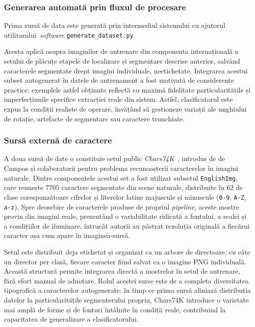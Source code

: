 \subsubsection{Generarea automată prin fluxul de procesare}
\indent\par
Prima sursă de data este generată prin intermediul sistemului cu ajutorul utilitarului~\textit{software} \texttt{generate\_dataset.py}

Acesta aplică asupra imaginilor de antrenare din componenta internațională a setului de plăcuțe etapele de localizare și segmentare descrise anterior, salvând caracterele segmentate drept imagini individuale, neetichetate. Integrarea acestui subset autogenerat în datele de antrenament a fost motivată de considerente practice: exemplele astfel obținute reflectă cu maximă fidelitate particularitățile și imperfecțiunile specifice extracției reale din sistem. Astfel, clasificatorul este expus la condiții realiste de operare, învățând să gestioneze variații ale unghiului de rotație, artefacte de segmentare sau caractere trunchiate.

\subsubsection{Sursă externă de caractere}
\indent\par
A doua sursă de date o constituie setul public \textit{Chars74K}~\cite{deCampos09}, introdus de de Campos și colaboratorii pentru problema recunoașterii caracterelor în imagini naturale. Dintre componentele acestui set a fost utilizat subsetul \texttt{EnglishImg}, care reunește $7705$ caractere segmentate din scene naturale, distribuite în $62$ de clase corespunzătoare cifrelor și literelor latine majuscule și minuscule (\texttt{0-9}, \texttt{A-Z}, \texttt{a-z}). Spre deosebire de caracterele produse de propriul \textit{pipeline}, aceste mostre provin din imagini reale, prezentând o variabilitate ridicată a fontului, a scalei și a condițiilor de iluminare, întrucât autorii au păstrat rezoluția originală a fiecărui caracter așa cum apare în imaginea-sursă.

Setul este distribuit deja etichetat și organizat ca un arbore de directoare, cu câte un director per clasă, fiecare caracter fiind salvat ca o imagine PNG individuală. Această structură permite integrarea directă a mostrelor în setul de antrenare, fără efort manual de adnotare. Rolul acestei surse este de a completa diversitatea tipografică a caracterelor autogenerate: în timp ce prima sursă aliniază distribuția datelor la particularitățile segmenterului propriu, Chars74K introduce o varietate mai amplă de forme și de fonturi întâlnite în condiții reale, contribuind la capacitatea de generalizare a clasificatorului.

